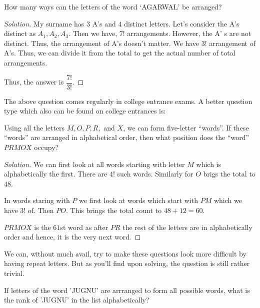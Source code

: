 \begin{example}
    How many ways can the letters of the word `AGARWAL' be arranged?
\end{example}
\begin{proof}
    [Solution]
    My surname has $3$ A's and $4$ distinct letters. Let's consider the A's distinct as $A_1,A_2,A_3$. 
    Then we have, $7!$ arrangements. However, the A' s are not distinct. Thus, the arrangement of 
    A's doesn't matter. We have $3!$ arrangement of A's. Thus, we can divide it from the total to get the 
    actual number of total arrangements.

    Thus, the answer is $\dfrac{7!}{3!}$.
\end{proof}
The above question comes regularly in college entrance exams. A better question type which 
also can be found on college entrances is:
\begin{example}
    Using all the letters $M, O, P, R,$ and $X$, we can form five-letter ``words''. 
    If these ``words'' are arranged in alphabetical order, then what position does the ``word'' 
    $PRMOX$ occupy?
\end{example}
\begin{proof}
    [Solution]
    We can first look at all words starting with letter $M$ which is alphabetically the first.
    There are $4!$ such words. Similarly for $O$ brigs the total to $48$.

    In words staring with $P$ we first look at words which start with $PM$ which we have $3!$ of. Then $PO$.
    This brings the total count to $48+12=60$.
    
    $PRMOX$ is the $61$st word as after $PR$ the rest of the letters are in 
    alphabetically order and hence, it is the very next word.
\end{proof}
We can, without much avail, try to make these questions look more difficult by having repeat letters. 
But as you'll find upon solving, the question is still rather trivial.
\begin{example}
    If letters of the word 'JUGNU' are arrranged to form all possible words, what is the rank of 'JUGNU' 
    in the list alphabetically?
\end{example}
